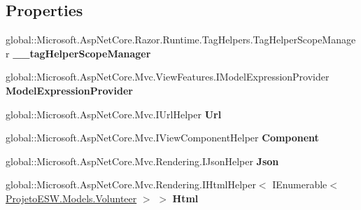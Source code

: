 \subsection*{Properties}
\begin{DoxyCompactItemize}
\item 
\mbox{\label{class_asp_net_core_1_1_views___volunteers___index_afaec1b651fdf0704ebfba8853912eed6}} 
global\+::\+Microsoft.\+Asp\+Net\+Core.\+Razor.\+Runtime.\+Tag\+Helpers.\+Tag\+Helper\+Scope\+Manager {\bfseries \+\_\+\+\_\+tag\+Helper\+Scope\+Manager}
\item 
global\+::\+Microsoft.\+Asp\+Net\+Core.\+Mvc.\+View\+Features.\+I\+Model\+Expression\+Provider {\bfseries Model\+Expression\+Provider}
\item 
\mbox{\label{class_asp_net_core_1_1_views___volunteers___index_ad8df1420f5b7c0643ed152bda555588e}} 
global\+::\+Microsoft.\+Asp\+Net\+Core.\+Mvc.\+I\+Url\+Helper {\bfseries Url}
\item 
\mbox{\label{class_asp_net_core_1_1_views___volunteers___index_aeee63f3ff6fe9a1ec3e08238e0e5c78f}} 
global\+::\+Microsoft.\+Asp\+Net\+Core.\+Mvc.\+I\+View\+Component\+Helper {\bfseries Component}
\item 
\mbox{\label{class_asp_net_core_1_1_views___volunteers___index_a7dee0aa4f52036b83ef8fbb20dafad5c}} 
global\+::\+Microsoft.\+Asp\+Net\+Core.\+Mvc.\+Rendering.\+I\+Json\+Helper {\bfseries Json}
\item 
\mbox{\label{class_asp_net_core_1_1_views___volunteers___index_a3beed31e0bc8a076dd612b0be18c1e4d}} 
global\+::\+Microsoft.\+Asp\+Net\+Core.\+Mvc.\+Rendering.\+I\+Html\+Helper$<$ I\+Enumerable$<$ \mbox{\hyperlink{class_projeto_e_s_w_1_1_models_1_1_volunteer}{Projeto\+E\+S\+W.\+Models.\+Volunteer}} $>$ $>$ {\bfseries Html}
\end{DoxyCompactItemize}
